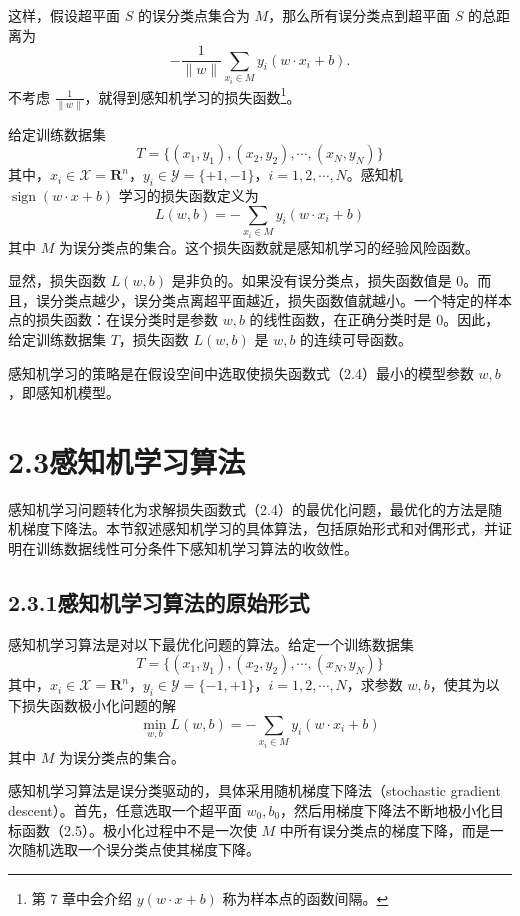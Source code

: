 \documentclass[UTF8,12pt,a4paper,fontset=fandol]{ctexart}
\begin{document}
这样，假设超平面 $S$ 的误分类点集合为 $M$，那么所有误分类点到超平面 $S$ 的总距离为
\[
  -\frac{1}{\|w\|}\sum_{x_i\in M}y_i(w\cdot x_i+b).
\]
不考虑 $\frac{1}{\|w\|}$，就得到感知机学习的损失函数\footnote{第 7 章中会介绍 $y(w\cdot x+b)$ 称为样本点的函数间隔。}。

给定训练数据集
\[
  T=\{(x_1,y_1),(x_2,y_2),\cdots,(x_N,y_N)\}
\]
其中，$x_i\in\mathcal{X}=\mathbf{R}^n$，$y_i\in\mathcal{Y}=\{+1,-1\}$，$i=1,2,\cdots,N$。感知机 $\operatorname{sign}(w\cdot x+b)$ 学习的损失函数定义为
\begin{equation}
  L(w,b)=-\sum_{x_i\in M}y_i(w\cdot x_i+b)
  \tag{2.4}
\end{equation}
其中 $M$ 为误分类点的集合。这个损失函数就是感知机学习的经验风险函数。

显然，损失函数 $L(w,b)$ 是非负的。如果没有误分类点，损失函数值是 0。而且，误分类点越少，误分类点离超平面越近，损失函数值就越小。一个特定的样本点的损失函数：在误分类时是参数 $w,b$ 的线性函数，在正确分类时是 0。因此，给定训练数据集 $T$，损失函数 $L(w,b)$ 是 $w,b$ 的连续可导函数。

感知机学习的策略是在假设空间中选取使损失函数式（2.4）最小的模型参数 $w,b$，即感知机模型。

\section*{2.3\quad 感知机学习算法}

感知机学习问题转化为求解损失函数式（2.4）的最优化问题，最优化的方法是随机梯度下降法。本节叙述感知机学习的具体算法，包括原始形式和对偶形式，并证明在训练数据线性可分条件下感知机学习算法的收敛性。

\subsection*{2.3.1\quad 感知机学习算法的原始形式}

感知机学习算法是对以下最优化问题的算法。给定一个训练数据集
\[
  T=\{(x_1,y_1),(x_2,y_2),\cdots,(x_N,y_N)\}
\]
其中，$x_i\in\mathcal{X}=\mathbf{R}^n$，$y_i\in\mathcal{Y}=\{-1,+1\}$，$i=1,2,\cdots,N$，求参数 $w,b$，使其为以下损失函数极小化问题的解
\begin{equation}
  \min_{w,b}L(w,b)=-\sum_{x_i\in M}y_i(w\cdot x_i+b)
  \tag{2.5}
\end{equation}
其中 $M$ 为误分类点的集合。

感知机学习算法是误分类驱动的，具体采用随机梯度下降法（stochastic gradient descent）。首先，任意选取一个超平面 $w_0,b_0$，然后用梯度下降法不断地极小化目标函数（2.5）。极小化过程中不是一次使 $M$ 中所有误分类点的梯度下降，而是一次随机选取一个误分类点使其梯度下降。
\end{document}
